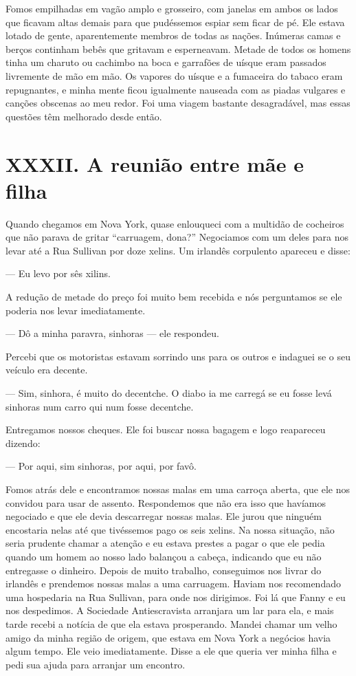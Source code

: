 Fomos empilhadas em vagão amplo e
grosseiro, com janelas em ambos os lados que ficavam altas demais para
que pudéssemos espiar sem ficar de pé. Ele estava lotado de gente,
aparentemente membros de todas as nações. Inúmeras camas e berços
continham bebês que gritavam e esperneavam. Metade de todos os homens
tinha um charuto ou cachimbo na boca e garrafões de uísque eram passados
livremente de mão em mão. Os vapores do uísque e a fumaceira do tabaco
eram repugnantes, e minha mente ficou igualmente nauseada com as piadas
vulgares e canções obscenas ao meu redor. Foi uma viagem bastante
desagradável, mas essas questões têm melhorado desde então.

\chapter{XXXII. A reunião entre mãe e
filha}

Quando chegamos em Nova York, quase
enlouqueci com a multidão de cocheiros que não parava de gritar
``carruagem, dona?'' Negociamos com um deles para nos levar até a Rua
Sullivan por doze xelins. Um irlandês corpulento apareceu e disse:

--- Eu levo por sês xilins.

A redução de metade do preço foi muito bem recebida e nós perguntamos se
ele poderia nos levar imediatamente.

--- Dô a minha paravra, sinhoras --- ele respondeu.

Percebi que os motoristas estavam sorrindo uns para os outros e indaguei
se o seu veículo era decente.

--- Sim, sinhora, é muito do decentche. O diabo ia me carregá se eu
fosse levá sinhoras num carro qui num fosse decentche.

Entregamos nossos cheques. Ele foi buscar nossa bagagem e logo
reapareceu dizendo:

--- Por aqui, sim sinhoras, por aqui, por favô.

Fomos atrás dele e encontramos nossas malas em uma carroça aberta, que
ele nos convidou para usar de assento. Respondemos que não era isso que
havíamos negociado e que ele devia descarregar nossas malas. Ele jurou
que ninguém encostaria nelas até que tivéssemos pago os seis xelins. Na
nossa situação, não seria prudente chamar a atenção e eu estava prestes
a pagar o que ele pedia quando um homem ao nosso lado balançou a cabeça,
indicando que eu não entregasse o dinheiro. Depois de muito trabalho,
conseguimos nos livrar do irlandês e prendemos nossas malas a uma
carruagem. Haviam nos recomendado uma hospedaria na Rua Sullivan, para
onde nos dirigimos. Foi lá que Fanny e eu nos despedimos. A Sociedade
Antiescravista arranjara um lar para ela, e mais tarde recebi a notícia
de que ela estava prosperando. Mandei chamar um velho amigo da minha
região de origem, que estava em Nova York a negócios havia algum tempo.
Ele veio imediatamente. Disse a ele que queria ver minha filha e pedi
sua ajuda para arranjar um encontro.

